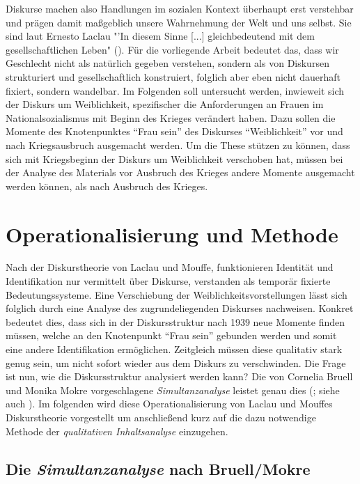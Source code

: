 \documentclass[12pt, titlepage=true, toc=bib]{scrartcl}
\begin{document}
\noindent Diskurse machen also Handlungen im sozialen Kontext überhaupt erst verstehbar und prägen damit maßgeblich unsere Wahrnehmung der Welt und uns selbst. Sie sind laut Ernesto Laclau "'In diesem Sinne [...] gleichbedeutend mit dem gesellschaftlichen Leben" (\cite[29]{nonhoff_ideologie_2007}). Für die vorliegende Arbeit bedeutet das, dass wir Geschlecht nicht als natürlich gegeben verstehen, sondern als von Diskursen strukturiert und gesellschaftlich konstruiert, folglich aber eben nicht dauerhaft fixiert, sondern wandelbar. Im Folgenden soll untersucht werden, inwieweit sich der Diskurs um Weiblichkeit, spezifischer die Anforderungen an Frauen im Nationalsozialismus mit Beginn des Krieges verändert haben. Dazu sollen die Momente des Knotenpunktes "`Frau sein"' des Diskurses "`Weiblichkeit"' vor und nach Kriegsausbruch ausgemacht werden. Um die These stützen zu können, dass sich mit Kriegsbeginn der Diskurs um Weiblichkeit verschoben hat, müssen bei der Analyse des Materials vor Ausbruch des Krieges andere Momente ausgemacht werden können, als nach Ausbruch des Krieges. 

\section{Operationalisierung und Methode}

Nach der Diskurstheorie von Laclau und Mouffe, funktionieren Identität und Identifikation nur vermittelt über Diskurse, verstanden als temporär fixierte Bedeutungssysteme. Eine Verschiebung der Weiblichkeitsvorstellungen lässt sich folglich durch eine Analyse des zugrundeliegenden Diskurses nachweisen. Konkret bedeutet dies, dass sich in der Diskursstruktur nach 1939 neue Momente finden müssen, welche an den Knotenpunkt "`Frau sein"' gebunden werden und somit eine andere Identifikation ermöglichen. Zeitgleich müssen diese qualitativ stark genug sein, um nicht sofort wieder aus dem Diskurs zu verschwinden. Die Frage ist nun, wie die Diskursstruktur analysiert werden kann? Die von Cornelia Bruell und Monika Mokre vorgeschlagene \textit{Simultanzanalyse} leistet genau dies (\cite*{bruell_chancen_2006}; siehe auch \cite{nonhoff_kollektive_2007}). Im folgenden wird diese Operationalisierung von Laclau und Mouffes Diskurstheorie vorgestellt um anschließend kurz auf die dazu notwendige Methode der \textit{qualitativen Inhaltsanalyse} einzugehen.

\subsection{Die \textit{Simultanzanalyse} nach Bruell/Mokre}
\end{document}

